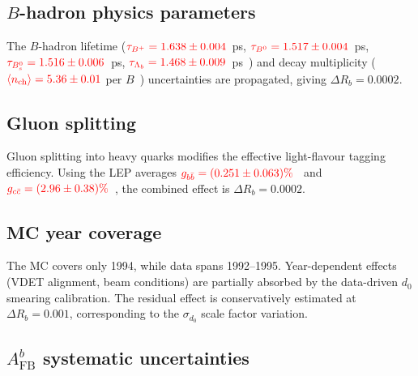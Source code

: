 \documentclass[11pt,a4paper]{article}
\newcommand{\external}[1]{\textcolor{red}{#1}}
\begin{document}
\subsection{$B$-hadron physics parameters}
\label{sec:syst-physics}

The $B$-hadron lifetime ($\external{\tau_{B^+} = 1.638 \pm 0.004}$~ps,
$\external{\tau_{B^0} = 1.517 \pm 0.004}$~ps,
$\external{\tau_{B_s^0} = 1.516 \pm 0.006}$~ps,
$\external{\tau_{\Lambda_b} = 1.468 \pm 0.009}$~ps~\cite{PDG:2024})
and decay multiplicity ($\external{\langle n_\text{ch}\rangle = 5.36 \pm 0.01}$
per $B$~\cite{PDG:2024}) uncertainties are propagated, giving
$\Delta R_b = 0.0002$.

\subsection{Gluon splitting}
\label{sec:syst-gluon}

Gluon splitting into heavy quarks modifies the effective
light-flavour tagging efficiency.
Using the LEP averages
$\external{g_{b\bar{b}} = (0.251 \pm 0.063)\%}$~\cite{ALEPH:gbb}
and $\external{g_{c\bar{c}} = (2.96 \pm 0.38)\%}$~\cite{LEP:gcc},
the combined effect is $\Delta R_b = 0.0002$.

\subsection{MC year coverage}
\label{sec:syst-mc-coverage}

The MC covers only 1994, while data spans 1992--1995.
Year-dependent effects (VDET alignment, beam conditions) are
partially absorbed by the data-driven $d_0$ smearing calibration.
The residual effect is conservatively estimated at
$\Delta R_b = 0.001$, corresponding to the $\sigma_{d_0}$
scale factor variation.

\subsection{$A_\text{FB}^b$ systematic uncertainties}
\label{sec:syst-afb}
\end{document}
